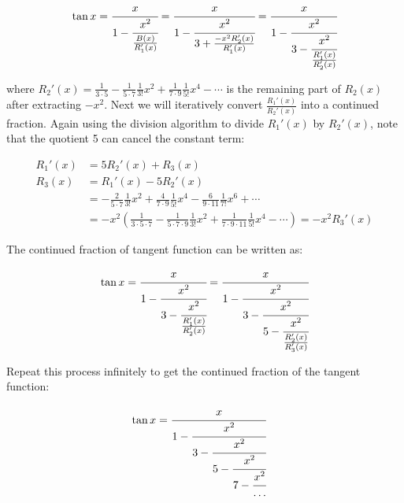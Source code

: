 \[
\tan x = \cfrac{x}{1 - \cfrac{x^2}{\frac{B(x)}{R_1'(x)}}}
 = \cfrac{x}{1 - \cfrac{x^2}{3 + \frac{-x^2R_2'(x)}{R_1'(x)}}}
 =\cfrac{x}{1 - \cfrac{x^2}{3 - \cfrac{x^2}{\frac{R_1'(x)}{R_2'(x)}}}}
\]

where $R_2'(x) = \frac{1}{3 \cdot 5} - \frac{1}{5 \cdot 7}\frac{1}{3!}x^2 + \frac{1}{7 \cdot 9}\frac{1}{5!}x^4 - \dotsb$ is the remaining part of $R_2(x)$ after extracting $-x^2$. Next we will iteratively convert $\frac{R_1'(x)}{R_2'(x)}$ into a continued fraction. Again using the division algorithm to divide $R_1'(x)$ by $R_2'(x)$, note that the quotient 5 can cancel the constant term:

\begin{align*}
R_1'(x) &= 5R_2'(x) + R_3(x)  \\
R_3(x) &= R_1'(x) - 5R_2'(x) \\
   &= - \frac{2}{5 \cdot 7}\frac{1}{3!}x^2 + \frac{4}{7 \cdot 9}\frac{1}{5!}x^4 - \frac{6}{9 \cdot 11}\frac{1}{7!}x^6 + \dotsb \\
   &= -x^2(\frac{1}{3 \cdot 5 \cdot 7} - \frac{1}{5 \cdot 7 \cdot 9}\frac{1}{3!}x^2 + \frac{1}{7 \cdot 9 \cdot 11}\frac{1}{5!}x^4 - \dotsb) = -x^2 R_3'(x)
\end{align*}

The continued fraction of tangent function can be written as:

\[
\tan x = \cfrac{x}{1 - \cfrac{x^2}{3 - \cfrac{x^2}{\frac{R_1'(x)}{R_2'(x)}}}} =
  \cfrac{x}{1 - \cfrac{x^2}{3 - \cfrac{x^2}{5 - \cfrac{x^2}{\frac{R_2'(x)}{R_3'(x)}}}}}
\]

Repeat this process infinitely to get the continued fraction of the tangent function:

\begin{align*}
\tan x  &= \cfrac{x}{1 - \cfrac{x^2}{3 - \cfrac{x^2}{5 - \cfrac{x^2}{7 - \cfrac{x^2}{\dotso}}}}}
\end{align*}
